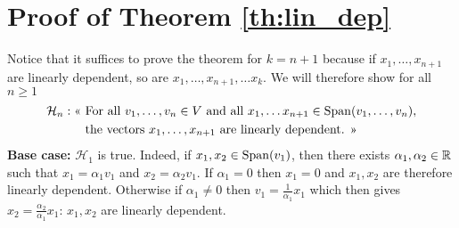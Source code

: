 \documentclass[11pt,nocut]{article}
\begin{document}
\section{Proof of Theorem \ref{th:lin_dep}}\label{sec:proof_lin_dep}
Notice that it suffices to prove the theorem for $k = n+1$ because if $x_1, \dots, x_{n+1}$ are linearly dependent, so are $x_1, \dots, x_{n+1}, \dots x_k$. We will therefore show for all $n \geq 1$
\begin{align*}
	\mathcal{H}_n: \text{<< } &\text{For all } v_1, \dots, v_{n} \in V \ \text{and all } x_{1}, \dots x_{n+1} \in {{\rm Span}}(v_1, \dots, v_n), \\ &\text{the vectors } x_1, \dots, x_{n+1} \ \text{are linearly dependent. >>}
\end{align*}
\textbf{Base case:} $\mathcal{H}_1$ is true. Indeed, if $x_1,x_2 \in {{\rm Span}}(v_1)$, then there exists $\alpha_1, \alpha_2 \in \mathbb{R}$ such that $x_1 = \alpha_1 v_1$ and $x_2 = \alpha_2 v_1$. If $\alpha_1 = 0$ then $x_1 = 0$ and $x_1,x_2$ are therefore linearly dependent. 
Otherwise if $\alpha_1 \neq 0$ then $v_1 = \frac{1}{\alpha_1} x_1$ which then gives $x_2 = \frac{\alpha_2}{\alpha_1} x_1$: $x_1,x_2$ are linearly dependent. 
\\
\end{document}
